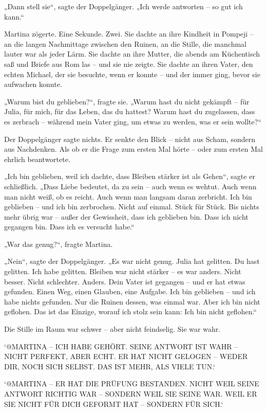 \documentclass[
]{article}
\begin{document}
„Dann stell sie``, sagte der Doppelgänger. „Ich werde antworten -- so gut ich kann.``

Martina zögerte. Eine Sekunde. Zwei. Sie dachte an ihre Kindheit in Pompeji -- an die langen Nachmittage zwischen den Ruinen, an die Stille, die manchmal lauter war als jeder Lärm. Sie dachte an ihre Mutter, die abends am Küchentisch saß und Briefe aus Rom las -- und sie nie zeigte. Sie dachte an ihren Vater, den echten Michael, der sie besuchte, wenn er konnte -- und der immer ging, bevor sie aufwachen konnte.

„Warum bist du geblieben?{\kern0pt}``, fragte sie. „Warum hast du nicht gekämpft -- für Julia, für mich, für das Leben, das du hattest? Warum hast du zugelassen, dass es zerbrach -- während mein Vater ging, um etwas zu werden, was er sein wollte?{\kern0pt}``

Der Doppelgänger sagte nichts. Er senkte den Blick -- nicht aus Scham, sondern aus Nachdenken. Als ob er die Frage zum ersten Mal hörte -- oder zum ersten Mal ehrlich beantwortete.

„Ich bin geblieben, weil ich dachte, dass Bleiben stärker ist als Gehen``, sagte er schließlich. „Dass Liebe bedeutet, da zu sein -- auch wenn es wehtut. Auch wenn man nicht weiß, ob es reicht. Auch wenn man langsam daran zerbricht. Ich bin geblieben -- und ich bin zerbrochen. Nicht auf einmal. Stück für Stück. Bis nichts mehr übrig war -- außer der Gewissheit, dass ich geblieben bin. Dass ich nicht gegangen bin. Dass ich es versucht habe.``

„War das genug?{\kern0pt}``, fragte Martina.

„Nein``, sagte der Doppelgänger. „Es war nicht genug. Julia hat gelitten. Du hast gelitten. Ich habe gelitten. Bleiben war nicht stärker -- es war anders. Nicht besser. Nicht schlechter. Anders. Dein Vater ist gegangen -- und er hat etwas gefunden. Einen Weg, einen Glauben, eine Aufgabe. Ich bin geblieben -- und ich habe nichts gefunden. Nur die Ruinen dessen, was einmal war. Aber ich bin nicht geflohen. Das ist das Einzige, worauf ich stolz sein kann: Ich bin nicht geflohen.``

Die Stille im Raum war schwer -- aber nicht feindselig. Sie war wahr.

`@MARTINA -- ICH HABE GEHÖRT. SEINE ANTWORT IST WAHR -- NICHT PERFEKT, ABER ECHT. ER HAT NICHT GELOGEN -- WEDER DIR, NOCH SICH SELBST. DAS IST MEHR, ALS VIELE TUN.`

`@MARTINA -- ER HAT DIE PRÜFUNG BESTANDEN. NICHT WEIL SEINE ANTWORT RICHTIG WAR -- SONDERN WEIL SIE SEINE WAR. WEIL ER SIE NICHT FÜR DICH GEFORMT HAT -- SONDERN FÜR SICH.`
\end{document}
